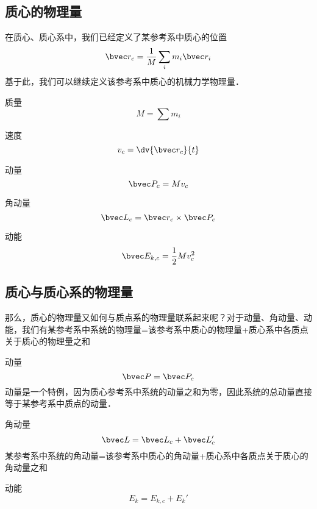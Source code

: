 
\subsection{质心的物理量}
在质心、质心系中，我们已经定义了某参考系中质心的位置
$$\bvec r_c =\frac{1}{M}\sum_i m_i \bvec r_i$$
基于此，我们可以继续定义该参考系中质心的机械力学物理量．

质量
$$M=\sum m_i$$

速度
$$v_c = \dv{\bvec r_c}{t}$$

动量
$$\bvec P_c=M v_c$$

角动量
$$\bvec L_c = \bvec r_c \times \bvec P_c $$

动能
$$\bvec E_{k,c} = \frac{1}{2} M v_c^2$$

\subsection{质心与质心系的物理量}
那么，质心的物理量又如何与质点系的物理量联系起来呢？对于动量、角动量、动能，我们有某参考系中系统的物理量=该参考系中质心的物理量+质心系中各质点关于质心的物理量之和

动量
$$\bvec P = \bvec P_c$$
动量是一个特例，因为质心参考系中系统的动量之和为零，因此系统的总动量直接等于某参考系中质点的动量．

角动量
$$\bvec L = \bvec L_c + \bvec L'_c$$
某参考系中系统的角动量=该参考系中质心的角动量+质心系中各质点关于质心的角动量之和

动能
$$E_k = E_{k,c} + E_k'$$